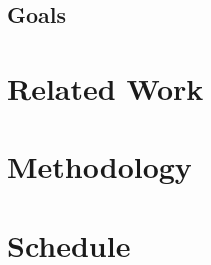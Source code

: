 \documentclass[a4paper, 12pt]{article}
\begin{document}



\subsection{Goals}



\section{Related Work}



\section{Methodology}



\section{Schedule}
\end{document}
